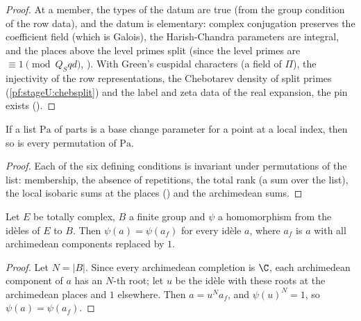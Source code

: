 \begin{proof}
At a member, the types of the datum are true (from the group condition of the row data), and the datum is elementary: complex
conjugation preserves the coefficient field (which is Galois), the Harish-Chandra parameters are integral, and the places above the
level primes split (since the level primes are $\equiv1\pmod{Q_Sqd}$, ).
With Green's cuspidal characters (a field of $\Pi$), the injectivity of the row representations, the Chebotarev density of split
primes (\cref{pf:stageU:chebsplit}) and the label and zeta data of the real expansion, the pin exists
().
\end{proof}

\begin{lemma}\label{pf:stageU:bcvperm}
If a list $\mathrm{Pa}$ of parts is a base change parameter for a point at a local index, then so is every permutation of
$\mathrm{Pa}$.
\end{lemma}

\begin{proof}
Each of the six defining conditions is invariant under permutations of the list: membership, the absence of repetitions, the
total rank (a sum over the list), the local isobaric sums at the places () and the
archimedean sums.
\end{proof}

\begin{lemma}\label{pf:stageU:finpart}
Let $E$ be totally complex, $B$ a finite group and $\psi$ a homomorphism from the id\`eles of $E$ to $B$. Then $\psi(a)=\psi(a_f)$ for
every id\`ele $a$, where $a_f$ is $a$ with all archimedean components replaced by $1$.
\end{lemma}

\begin{proof}
Let $N=|B|$. Since every archimedean completion is $\C$, each archimedean component of $a$ has an $N$-th root; let $u$ be the id\`ele
with these roots at the archimedean places and $1$ elsewhere. Then $a=u^Na_f$, and $\psi(u)^N=1$, so $\psi(a)=\psi(a_f)$.
\end{proof}

